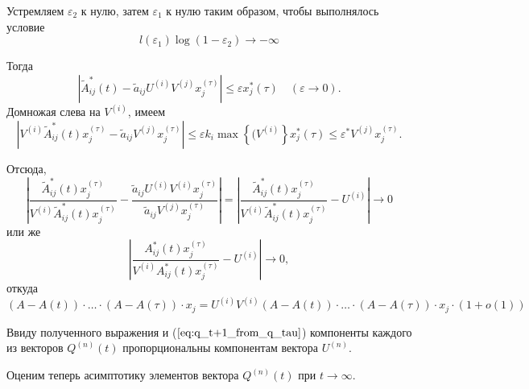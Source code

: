 \documentclass[12pt]{article}
\renewcommand{\leq}{\leqslant}
\renewcommand{\epsilon}{\varepsilon}
\begin{document}
Устремляем $\epsilon_2$ к нулю, затем $\epsilon_1$ к нулю таким образом, чтобы выполнялось условие
\begin{equation}
	l(\epsilon_1) \log(1 - \epsilon_2) \rightarrow -\infty
\end{equation}

Тогда 
\begin{equation}
	\left| \tilde{A}^*_{ij}(t) - \tilde{a}_{ij} U^{(i)} V^{(j)} x^{(\tau)}_j \right| \leq \epsilon x^*_j(\tau)\quad (\epsilon \rightarrow 0).
\end{equation}
Домножая слева на $V^{(i)}$, имеем
\begin{equation}
	\left| V^{(i)} \tilde{A}^*_{ij}(t) x^{(\tau)}_j - \tilde{a}_{ij} V^{(j)} x^{(\tau)}_j \right| \leq \epsilon k_i \max \left\{ (V^{(i)} \right\} x^*_j(\tau) \leq \epsilon^* V^{(j)} x^{(\tau)}_j.
\end{equation}

Отсюда,
\begin{equation}
	\left| \frac{\tilde{A}^*_{ij}(t) x^{(\tau)}_j}{V^{(i)} \tilde{A}^*_{ij}(t) x^{(\tau)}_j} - \frac{\tilde{a}_{ij} U^{(i)} V^{(i)} x^{(\tau)}_j}{\tilde{a}_{ij} V^{(j)} x^{(\tau)}_j} \right| = \left| \frac{\tilde{A}^*_{ij}(t) x^{(\tau)}_j}{V^{(i)} \tilde{A}^*_{ij}(t) x^{(\tau)}_j} - U^{(i)} \right| \rightarrow 0
\end{equation}
или же
\begin{equation}
	\left| \frac{A^*_{ij}(t) x^{(\tau)}_j}{V^{(i)} A^*_{ij}(t) x^{(\tau)}_j} - U^{(i)} \right| \rightarrow 0,
\end{equation}
откуда
\begin{equation}
	(A - A(t)) \cdot \ldots \cdot (A - A(\tau)) \cdot x_j = U^{(i)} V^{(i)} (A - A(t)) \cdot \ldots \cdot (A - A(\tau)) \cdot x_j \cdot (1 + o(1))
\end{equation}

Ввиду полученного выражения и ($\ref{eq:q_t+1_from_q_tau}$) компоненты каждого из векторов $Q^{(n)}(t)$ пропорциональны компонентам вектора $U^{(n)}$.

Оценим теперь асимптотику элементов вектора $Q^{(n)}(t)$ при $t \rightarrow \infty$.
\end{document}
